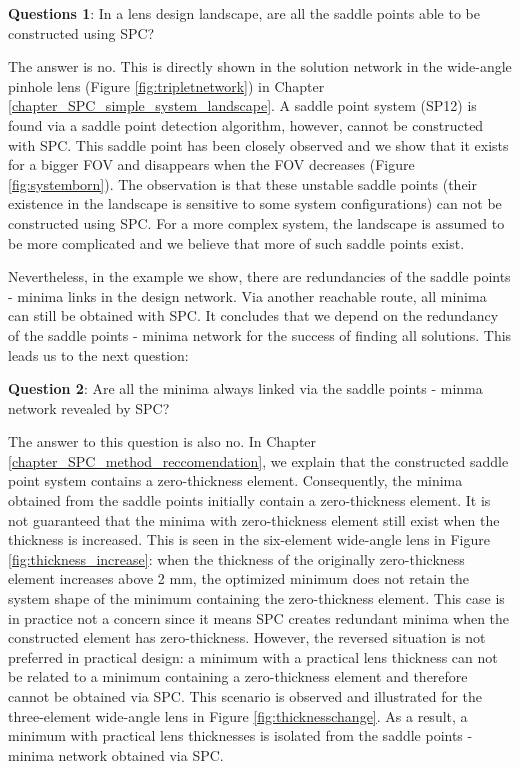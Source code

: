 \vspace{1em}

\textbf{Questions 1}:  In a lens design landscape, are all the saddle points able to be constructed using SPC? 

The answer is no. This is directly shown in the solution network in the wide-angle pinhole lens (Figure \ref{fig:tripletnetwork}) in Chapter \ref{chapter_SPC_simple_system_landscape}. A saddle point system (SP12) is found via a saddle point detection algorithm, however, cannot be constructed with SPC. This saddle point has been closely observed and we show that it exists for a bigger FOV and disappears when the FOV decreases (Figure \ref{fig:systemborn}). The observation is that these unstable saddle points (their existence in the landscape is sensitive to some system configurations) can not be constructed using SPC. For a more complex system, the landscape is assumed to be more complicated and we believe that more of such saddle points exist. 

Nevertheless, in the example we show, there are redundancies of the saddle points - minima links in the design network. Via another reachable route, all minima can still be obtained with SPC. It concludes that we depend on the redundancy of the saddle points - minima network for the success of finding all solutions. This leads us to the next question: 
\vspace{1em}

\textbf{Question 2}: Are all the minima always linked via the saddle points - minma network revealed by SPC?

The answer to this question is also no. In Chapter \ref{chapter_SPC_method_reccomendation}, we explain that the constructed saddle point system contains a zero-thickness element. Consequently, the minima obtained from the saddle points initially contain a zero-thickness element. It is not guaranteed that the minima with zero-thickness element still exist when the thickness is increased. This is seen in the six-element wide-angle lens in Figure \ref{fig:thickness_increase}: when the thickness of the originally zero-thickness element increases above 2 mm, the optimized minimum does not retain the system shape of the minimum containing the zero-thickness element. This case is in practice not a concern since it means SPC creates redundant minima when the constructed element has zero-thickness. However, the reversed situation is not preferred in practical design: a minimum with a practical lens thickness can not be related to a minimum containing a zero-thickness element and therefore cannot be obtained via SPC. This scenario is observed and illustrated for the three-element wide-angle lens in Figure \ref{fig:thicknesschange}. As a result, a minimum with practical lens thicknesses is isolated from the saddle points - minima network obtained via SPC. 

